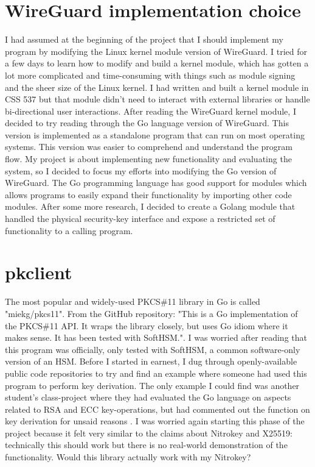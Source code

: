 \documentclass [11pt, proquest] {uwthesis}[2020/02/24]
\begin{document}
\section{WireGuard implementation choice}
I had assumed at the beginning of the project that I should implement my program by modifying the Linux kernel module version of WireGuard. I tried for a few days to learn how to modify and build a kernel module, which has gotten a lot more complicated and time-consuming with things such as module signing and the sheer size of the Linux kernel. I had written and built a kernel module in CSS 537 but that module didn't need to interact with external libraries or handle bi-directional user interactions. After reading the WireGuard kernel module, I decided to try reading through the Go language version of WireGuard. This version is implemented as a standalone program that can run on most operating systems. This version was easier to comprehend and understand the program flow. My project is about implementing new functionality and evaluating the system, so I decided to focus my efforts into modifying the Go version of WireGuard.
The Go programming language has good support for modules which allows programs to easily expand their functionality by importing other code modules. After some more research, I decided to create a Golang module that handled the physical security-key interface and expose a restricted set of functionality to a calling program. 

\section{pkclient}
\label{pk_design}
The most popular and widely-used PKCS\#11 library in Go is called "miekg/pkcs11". From the GitHub repository: "This is a Go implementation of the PKCS\#11 API. It wraps the library closely, but uses Go idiom where it makes sense. It has been tested with SoftHSM."\cite{gieben_pkcs11_2022}. 
I was worried after reading that this program was officially, only tested with SoftHSM, a common software-only version of an HSM. Before I started in earnest, I dug through openly-available public code repositories to try and find an example where someone had used this program to perform key derivation. The only example I could find was another student's class-project where they had evaluated the Go language on aspects related to RSA and ECC key-operations, but had commented out the function on key derivation for unsaid reasons \cite{quapka_go-analysis_2019}. I was worried again starting this phase of the project because it felt very similar to the claims about Nitrokey and X25519: technically this should work but there is no real-world demonstration of the functionality. Would this library actually work with my Nitrokey?
\end{document}
